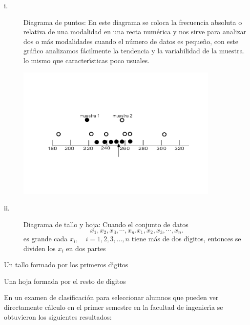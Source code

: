 \begin{description}
\item[i.] Diagrama de puntos: En este diagrama se coloca la frecuencia
absoluta o relativa de una modalidad en una recta num\'{e}rica y nos sirve
para analizar dos o m\'{a}s modalidades cuando el n\'{u}mero de datos es
peque\~{n}o, con este gr\'{a}fico analizamos f\'{a}cilmente la tendencia y la
variabilidad de la muestra. lo mismo que caracter\'{\i}sticas poco usuales.%
\begin{center}
\includegraphics[width=10cm]{punto.png}
\end{center}

\item[ii.] Diagrama de tallo y hoja: Cuando el conjunto de datos
\[
x_{1},x_{2},x_{3},\cdots,x_{n}.x_{1},x_{2},x_{3},\cdots,x_{n}.
\]
es grande cada $x_{i},\quad i=1,2,3,...,n$ tiene m\'{a}s de dos d\'{\i}gitos,
entonces se dividen los $x_{i}$ en dos partes
\end{description}

\bigskip Un tallo formado por los primeros d\'{\i}gitos

\bigskip Una hoja formada por el resto de d\'{\i}gitos

\begin{example}
\bigskip En un examen de clasificaci\'{o}n para seleccionar alumnos que pueden
ver directamente c\'{a}lculo en el primer semestre en la facultad de
ingenier\'{\i}a se obtuvieron los siguientes resultados:
\end{example}

